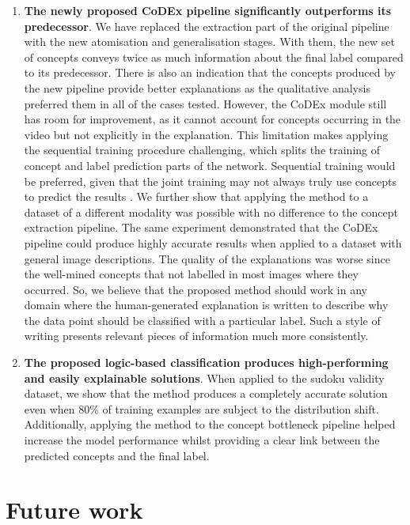 \begin{enumerate}
    
    \item \textbf{The newly proposed CoDEx pipeline significantly outperforms its predecessor}. 
    We have replaced the extraction part of the original pipeline with the new atomisation and generalisation stages.
    With them, the new set of concepts conveys twice as much information about the final label compared to its predecessor.
    There is also an indication that the concepts produced by the new pipeline provide better explanations as the qualitative analysis preferred them in all of the cases tested. 
    However, the CoDEx module still has room for improvement, as it cannot account for concepts occurring in the video but not explicitly in the explanation.
    This limitation makes applying the sequential training procedure challenging, which splits the training of concept and label prediction parts of the network.
    Sequential training would be preferred, given that the joint training may not always truly use concepts to predict the results \cite{RefWorks:RefID:68-margeloiu2021concept}.
    We further show that applying the method to a dataset of a different modality was possible with no difference to the concept extraction pipeline.
    The same experiment demonstrated that the CoDEx pipeline could produce highly accurate results when applied to a dataset with general image descriptions.
    The quality of the explanations was worse since the well-mined concepts that not labelled in most images where they occurred.
    So, we believe that the proposed method should work in any domain where the human-generated explanation is written to describe why the data point should be classified with a particular label.
    Such a style of writing presents relevant pieces of information much more consistently.
    
    \item \textbf{The proposed logic-based classification produces high-performing and easily explainable solutions}.
    When applied to the sudoku validity dataset, we show that the method produces a completely accurate solution even when 80\% of training examples are subject to the distribution shift.
    Additionally, applying the method to the concept bottleneck pipeline helped increase the model performance whilst providing a clear link between the predicted concepts and the final label.
\end{enumerate}

\section{Future work}

